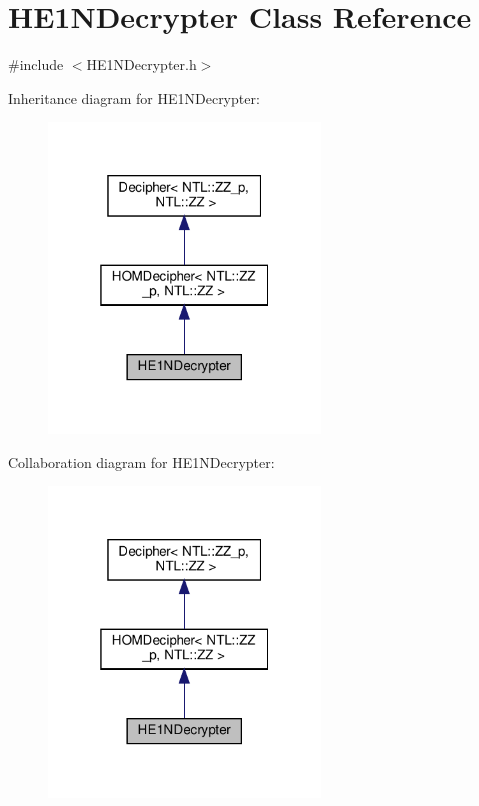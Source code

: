 \hypertarget{classHE1NDecrypter}{}\section{H\+E1\+N\+Decrypter Class Reference}
\label{classHE1NDecrypter}


{\ttfamily \#include $<$H\+E1\+N\+Decrypter.\+h$>$}



Inheritance diagram for H\+E1\+N\+Decrypter\+:\nopagebreak
\begin{figure}[H]
\begin{center}
\leavevmode
\includegraphics[width=205pt]{classHE1NDecrypter__inherit__graph}
\end{center}
\end{figure}


Collaboration diagram for H\+E1\+N\+Decrypter\+:\nopagebreak
\begin{figure}[H]
\begin{center}
\leavevmode
\includegraphics[width=205pt]{classHE1NDecrypter__coll__graph}
\end{center}
\end{figure}
